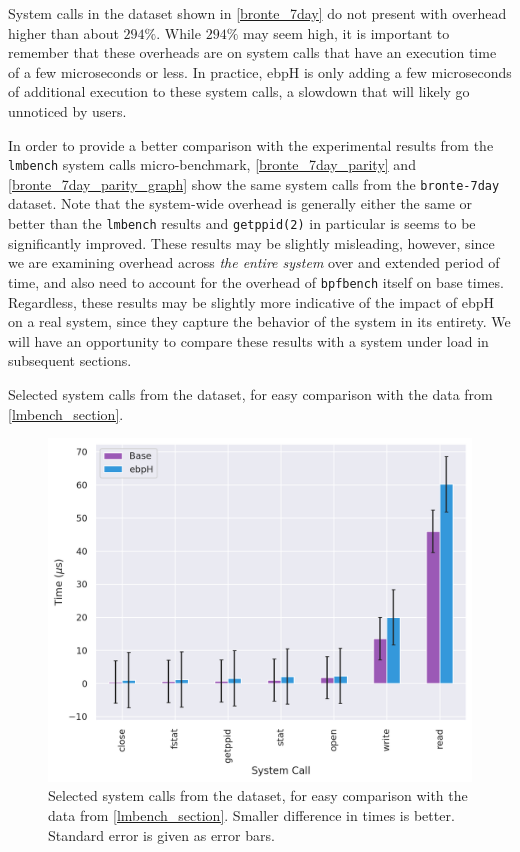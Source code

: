 \documentclass[
  12pt]{findlay}
\newcommand{\passthrough}[1]{#1}
\begin{document}
System calls in the dataset shown in \autoref{bronte_7day} do not
present with overhead higher than about \(294\%\). While \(294\%\) may
seem high, it is important to remember that these overheads are on
system calls that have an execution time of a few microseconds or less.
In practice, ebpH is only adding a few microseconds of additional
execution to these system calls, a slowdown that will likely go
unnoticed by users.

In order to provide a better comparison with the experimental results
from the \passthrough{\lstinline!lmbench!} system calls micro-benchmark,
\autoref{bronte_7day_parity} and \autoref{bronte_7day_parity_graph} show
the same system calls from the \passthrough{\lstinline!bronte-7day!}
dataset. Note that the system-wide overhead is generally either the same
or better than the \passthrough{\lstinline!lmbench!} results and
\passthrough{\lstinline!getppid(2)!} in particular is seems to be
significantly improved. These results may be slightly misleading,
however, since we are examining overhead across \emph{the entire system}
over and extended period of time, and also need to account for the
overhead of \passthrough{\lstinline!bpfbench!} itself on base times.
Regardless, these results may be slightly more indicative of the impact
of ebpH on a real system, since they capture the behavior of the system
in its entirety. We will have an opportunity to compare these results
with a system under load in subsequent sections.

\begin{table}
    \caption[Selected system calls from the  dataset]{
        Selected system calls from the  dataset, for easy
        comparison with the  data from \autoref{lmbench_section}.
    }
    \label{bronte_7day_parity}
    
\end{table}

\begin{figure}
    \caption[Selected system calls from the  dataset]{
        Selected system calls from the  dataset, for easy
        comparison with the  data from \autoref{lmbench_section}.
        Smaller difference in times is better. Standard error is given as error bars.
    }
    \label{bronte_7day_parity_graph}
    \includegraphics[width=.6\textwidth]{../data/bench/bronte-7day/lmbench_parity_times.png}
\end{figure}
\end{document}
